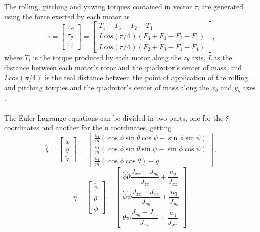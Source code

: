 \\\\
The rolling, pitching and yawing torques contained in vector $\tau$, are generated using the force exerted by each motor as
\begin{equation}
	\tau = \begin{bmatrix}
	\tau_{\psi}\\
	\tau_{\theta}\\
	\tau_{\phi}
	\end{bmatrix} = \begin{bmatrix}
								T_{1} + T_{3} - T_{2} - T_{4}\\
								Lcos(\pi/4)(F_{3}+F_{4}-F_{2}-F_{1})\\
								Lcos(\pi/4)(F_{2}+F_{3}-F_{1}-F_{4})
							\end{bmatrix},
	\label{ec:torques}						
\end{equation}
where $ T_{i} $ is the torque produced by each motor along the $z_{b}$ axis, $ L $ is the distance between each motor's rotor and the quadrotor's center of mass, and $Lcos(\pi/4)$ is the real distance between the point of application of the rolling and pitching torques and the quadrotor's center of mass along the $x_b$ and $y_b$ axes \cite{Faessler2016}.\\\\
The Euler-Lagrange equations can be divided in two parts, one for the $\xi$ coordinates and another for the $\eta$ coordinates, getting
\begin{equation}
\label{eqn:E-L1}
\ddot{\xi} =
\begin{bmatrix}
\ddot{x} \\ \ddot{y} \\ \ddot{z}
\end{bmatrix} 
=
\begin{bmatrix}
\frac{u_{1}}{m}(\cos\phi\sin\theta\cos\psi + \sin\phi\sin\psi) \\
 \frac{u_{1}}{m}(\cos\phi\sin\theta\sin\psi - \sin\phi\cos\psi) \\
\frac{u_{1}}{m}(\cos\phi\cos\theta) - g
\end{bmatrix},
\end{equation}
\begin{equation}
\label{eqn:E-L2}
\ddot{\eta} =
\begin{bmatrix}
\ddot{\psi} \\ \ddot{\theta} \\ \ddot{\phi}
\end{bmatrix} 
 =
\begin{bmatrix}
\dot{\phi}\dot{\theta}\dfrac{J_{xx}-J_{yy}}{J_{zz}} + \dfrac{u_{2}}{J_{zz}} \\
\dot{\phi}\dot{\psi}\dfrac{J_{zz}-J_{xx}}{J_{yy}} + \dfrac{u_{3}}{J_{yy}} \\
 \dot{\theta}\dot{\psi}\dfrac{J_{yy}-J_{zz}}{J_{xx}} +  \dfrac{u_{4}}{J_{xx}}
\end{bmatrix},
\end{equation}
